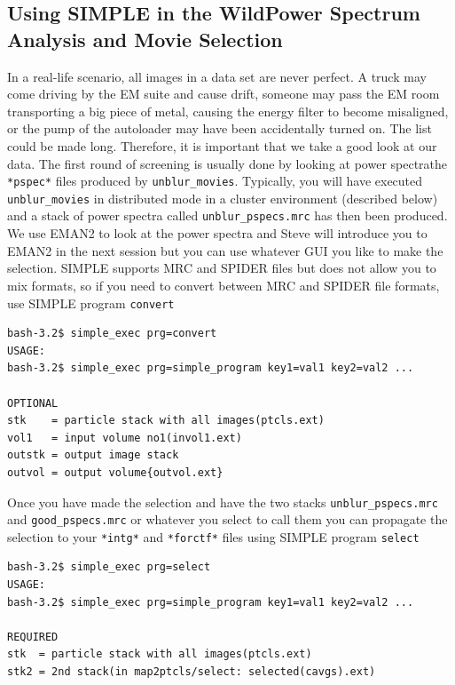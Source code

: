 \documentclass[a4paper,11pt]{article}
\newcommand{\prgname}[1]{\textcolor{NavyBlue}{\texttt{#1}}}
\begin{document}
\begin{tcolorbox}[breakable,colback=white,colframe=orange,width=\dimexpr\textwidth+12mm\relax,enlarge left by=-6mm]
\subsection{Using SIMPLE in the Wild\textemdash{}Power Spectrum Analysis and Movie Selection}
In a real-life scenario, all images in a data set are never perfect. A truck may come driving by the EM suite and cause drift, someone may pass the EM room transporting a big piece of metal, causing the energy filter to become misaligned, or the pump of the autoloader may have been accidentally turned on. The list could be made long. Therefore, it is important that we take a good look at our data. The first round of screening is usually done by looking at power spectra\textemdash{}the \texttt{*pspec*} files produced by \prgname{unblur\_movies}. Typically, you will have executed \texttt{unblur\_movies} in distributed mode in a cluster environment (described below) and a stack of power spectra called \texttt{unblur\_pspecs.mrc} has then been produced. We use EMAN2 to look at the power spectra and Steve will introduce you to EMAN2 in the next session but you can use whatever GUI you like to make the selection. SIMPLE supports MRC and SPIDER files but does not allow you to mix formats, so if you need to convert between MRC and SPIDER file formats, use SIMPLE program \prgname{convert}
\begin{verbatim}
bash-3.2$ simple_exec prg=convert
USAGE:
bash-3.2$ simple_exec prg=simple_program key1=val1 key2=val2 ...

OPTIONAL
stk    = particle stack with all images(ptcls.ext)
vol1   = input volume no1(invol1.ext)
outstk = output image stack
outvol = output volume{outvol.ext}
\end{verbatim}
Once you have made the selection and have the two stacks \texttt{unblur\_pspecs.mrc} and \texttt{good\_pspecs.mrc} or whatever you select to call them you can propagate the selection to your \texttt{*intg*} and \texttt{*forctf*} files using SIMPLE program \prgname{select}
\begin{verbatim}
bash-3.2$ simple_exec prg=select
USAGE:
bash-3.2$ simple_exec prg=simple_program key1=val1 key2=val2 ...

REQUIRED
stk  = particle stack with all images(ptcls.ext)
stk2 = 2nd stack(in map2ptcls/select: selected(cavgs).ext)


\end{verbatim}
\end{tcolorbox}
\end{document}
